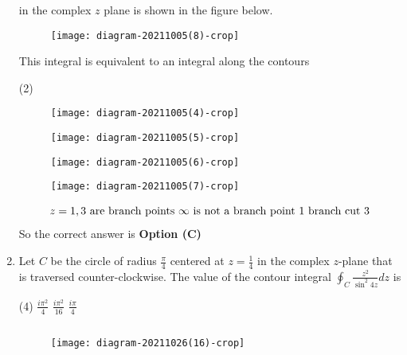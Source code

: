 \begin{enumerate}[label=\color{ocre}\textbf{\arabic*.}]
$$	$$
	in the complex $z$ plane is shown in the figure below.\\
	\begin{figure}[H]
		\centering
		\texttt{[image: diagram-20211005(8)-crop]}
	\end{figure}
	This integral is equivalent to an integral along the contours
	{}
	\begin{tasks}(2)
		\task[\textbf{A.}] \begin{figure}[H]
			\centering
			\texttt{[image: diagram-20211005(4)-crop]}
		\end{figure}
		\task[\textbf{B.}] \begin{figure}[H]
			\centering
			\texttt{[image: diagram-20211005(5)-crop]}
		\end{figure}
		\task[\textbf{C.}] \begin{figure}[H]
			\centering
			\texttt{[image: diagram-20211005(6)-crop]}
		\end{figure}
		\task[\textbf{D.}] \begin{figure}[H]
			\centering
			\texttt{[image: diagram-20211005(7)-crop]}
		\end{figure}
	\end{tasks}
	\begin{answer}
		\begin{align*}
		\intertext{$z=1,3$ are branch points $\infty$ is not a branch point 1 branch cut 3}
		\end{align*}
		So the correct answer is \textbf{Option (C)}
	\end{answer}
	\item  Let $C$ be the circle of radius $\frac{\pi}{4}$ centered at $z=\frac{1}{4}$ in the complex $z$-plane that is traversed counter-clockwise. The value of the contour integral $\oint_{C} \frac{z^{2}}{\sin ^{2} 4 z} d z$ is
	{}
	\begin{tasks}(4)
		\task[\textbf{B.}] $\frac{i \pi^{2}}{4}$
		\task[\textbf{C.}] $\frac{i \pi^{2}}{16}$
		\task[\textbf{D.}] $\frac{i \pi}{4}$
	\end{tasks}
	\begin{answer}$\left. \right. $
		\begin{figure}[H]
			\centering
			\texttt{[image: diagram-20211026(16)-crop]}
		\end{figure}
		\begin{align*}

\end{align*}
\end{answer}
\end{enumerate}
